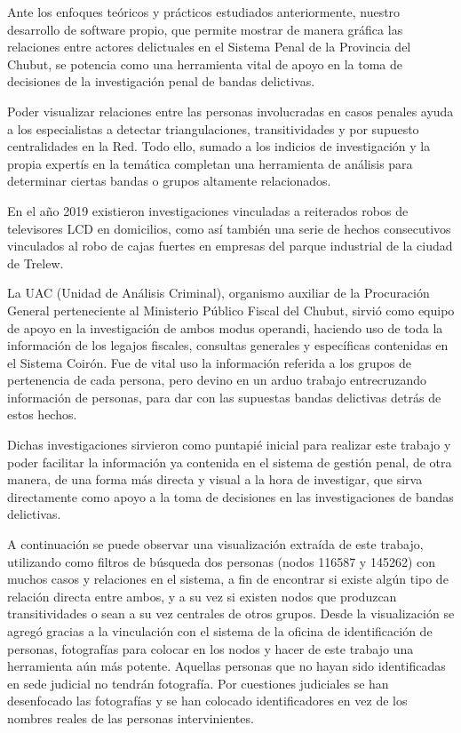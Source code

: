 Ante los enfoques teóricos y prácticos estudiados anteriormente, nuestro desarrollo de software propio, que permite mostrar de manera gráfica las relaciones entre actores delictuales en el Sistema Penal de la Provincia del Chubut, se potencia como una herramienta vital de apoyo en la toma de decisiones de la investigación penal de bandas delictivas.

Poder visualizar relaciones entre las personas involucradas en casos penales ayuda a los especialistas a detectar triangulaciones, transitividades y por supuesto centralidades en la Red. Todo ello, sumado a los indicios de investigación y la propia expertís en la temática completan una herramienta de análisis para determinar ciertas bandas o grupos altamente relacionados.

En el año 2019 existieron investigaciones vinculadas a reiterados robos de televisores LCD en domicilios, como así también una serie de hechos consecutivos vinculados al robo de cajas fuertes en empresas del parque industrial de la ciudad de Trelew.

La UAC (Unidad de Análisis Criminal), organismo auxiliar de la Procuración General perteneciente al Ministerio Público Fiscal del Chubut, sirvió como equipo de apoyo en la investigación de ambos modus operandi, haciendo uso de toda la información de los legajos fiscales, consultas generales y específicas contenidas en el Sistema Coirón. Fue de vital uso la información referida a los grupos de pertenencia de cada persona, pero devino en un arduo trabajo entrecruzando información de personas, para dar con las supuestas bandas delictivas detrás de estos hechos.

Dichas investigaciones sirvieron como puntapié inicial para realizar este trabajo y poder facilitar la información ya contenida en el sistema de gestión penal, de otra manera, de una forma más directa y visual a la hora de investigar, que sirva directamente como apoyo a la toma de decisiones en las investigaciones de bandas delictivas. 

A continuación se puede observar una visualización extraída de este trabajo, utilizando como filtros de búsqueda dos personas (nodos 116587 y 145262) con muchos casos y relaciones en el sistema, a fin de encontrar si existe algún tipo de relación directa entre ambos, y a su vez si existen nodos que produzcan transitividades o sean a su vez centrales de otros grupos.
Desde la visualización se agregó gracias a la vinculación con el sistema de la oficina de identificación de personas, fotografías para colocar en los nodos y hacer de este trabajo una herramienta aún más potente. Aquellas personas que no hayan sido identificadas en sede judicial no tendrán fotografía. Por cuestiones judiciales se han desenfocado las fotografías y se han colocado identificadores en vez de los nombres reales de las personas intervinientes.

